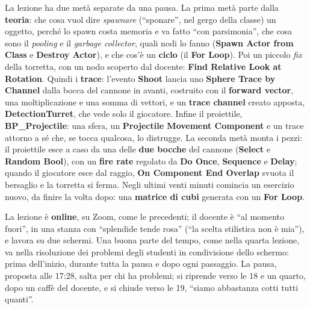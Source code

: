 La lezione ha due metà separate da una pausa. La prima metà parte dalla
\textbf{teoria}: che cosa vuol dire \emph{spawnare} (``sponare'', nel gergo della
classe) un oggetto, perché lo spawn costa memoria e va fatto ``con parsimonia'', che
cosa sono il \emph{pooling} e il \emph{garbage collector}, quali nodi lo fanno
(\textbf{Spawn Actor from Class} e \textbf{Destroy Actor}), e che cos'è un
\textbf{ciclo} (il \textbf{For Loop}). Poi un piccolo \emph{fix} della torretta, con
un nodo scoperto dal docente: \textbf{Find Relative Look at Rotation}. Quindi i
\textbf{trace}: l'evento \textbf{Shoot} lancia uno \textbf{Sphere Trace by Channel}
dalla bocca del cannone in avanti, costruito con il \textbf{forward vector}, una
moltiplicazione e una somma di vettori, e un \textbf{trace channel} creato apposta,
\textbf{DetectionTurret}, che vede solo il giocatore. Infine il proiettile,
\textbf{BP\_Projectile}: una sfera, un \textbf{Projectile Movement Component} e un
trace attorno a sé che, se tocca qualcosa, lo distrugge. La seconda metà monta i
pezzi: il proiettile esce a caso da una delle \textbf{due bocche} del cannone
(\textbf{Select} e \textbf{Random Bool}), con un \textbf{fire rate} regolato da
\textbf{Do Once}, \textbf{Sequence} e \textbf{Delay}; quando il giocatore esce dal
raggio, \textbf{On Component End Overlap} svuota il bersaglio e la torretta si ferma.
Negli ultimi venti minuti comincia un esercizio nuovo, da finire la volta dopo: una
\textbf{matrice di cubi} generata con un \textbf{For Loop}.

La lezione è \textbf{online}, su Zoom, come le precedenti; il docente è ``al momento
fuori'', in una stanza con ``splendide tende rosa'' (``la scelta stilistica non è mia''),
e lavora su due schermi. Una buona parte del tempo, come nella quarta lezione, va nella
risoluzione dei problemi degli studenti in condivisione dello schermo: prima
dell'inizio, durante tutta la pausa e dopo ogni passaggio. La pausa, proposta alle
17:28, salta per chi ha problemi; si riprende verso le 18 e un quarto, dopo un caffè
del docente, e si chiude verso le 19, ``siamo abbastanza cotti tutti quanti''.

